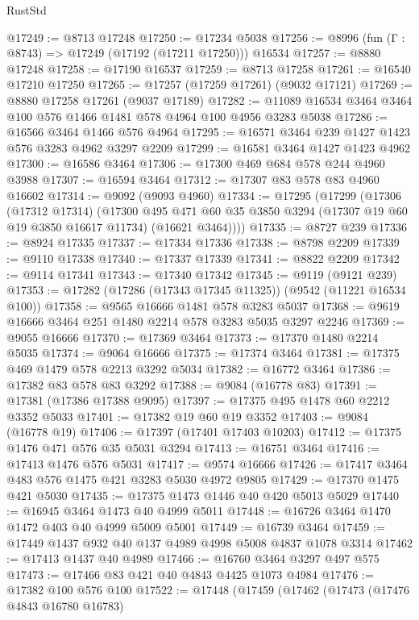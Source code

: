 \begin{lexlean}{RustStd}
\begin{coremodule}
@17249 := @8713 @17248
@17250 := @17234 @5038
@17256 := @8996 (fun (Γ : @8743) => @17249 (@17192 (@17211 @17250))) @16534
@17257 := @8880 @17248
@17258 := @17190 @16537
@17259 := @8713 @17258
@17261 := @16540 @17210 @17250
@17265 := @17257 (@17259 @17261) (@9032 @17121)
@17269 := @8880 @17258 @17261 (@9037 @17189)
@17282 := @11089 @16534 @3464 @3464 @100 @576 @1466 @1481 @578 @4964 @100 @4956 @3283 @5038
@17286 := @16566 @3464 @1466 @576 @4964
@17295 := @16571 @3464 @239 @1427 @1423 @576 @3283 @4962 @3297 @2209
@17299 := @16581 @3464 @1427 @1423 @4962
@17300 := @16586 @3464
@17306 := @17300 @469 @684 @578 @244 @4960 @3988
@17307 := @16594 @3464
@17312 := @17307 @83 @578 @83 @4960 @16602
@17314 := @9092 (@9093 @4960)
@17334 := @17295
    (@17299
      (@17306
        (@17312 @17314)
        (@17300
          @495
          @471
          @60
          @35
          @3850
          @3294
          (@17307 @19 @60 @19 @3850 @16617 @11734)
          (@16621 @3464))))
@17335 := @8727 @239
@17336 := @8924 @17335
@17337 := @17334 @17336
@17338 := @8798 @2209
@17339 := @9110 @17338
@17340 := @17337 @17339
@17341 := @8822 @2209
@17342 := @9114 @17341
@17343 := @17340 @17342
@17345 := @9119 (@9121 @239)
@17353 := @17282 (@17286 (@17343 @17345 @11325)) (@9542 (@11221 @16534 @100))
@17358 := @9565 @16666 @1481 @578 @3283 @5037
@17368 := @9619 @16666 @3464 @251 @1480 @2214 @578 @3283 @5035 @3297 @2246
@17369 := @9055 @16666
@17370 := @17369 @3464
@17373 := @17370 @1480 @2214 @5035
@17374 := @9064 @16666
@17375 := @17374 @3464
@17381 := @17375 @469 @1479 @578 @2213 @3292 @5034
@17382 := @16772 @3464
@17386 := @17382 @83 @578 @83 @3292
@17388 := @9084 (@16778 @83)
@17391 := @17381 (@17386 @17388 @9095)
@17397 := @17375 @495 @1478 @60 @2212 @3352 @5033
@17401 := @17382 @19 @60 @19 @3352
@17403 := @9084 (@16778 @19)
@17406 := @17397 (@17401 @17403 @10203)
@17412 := @17375 @1476 @471 @576 @35 @5031 @3294
@17413 := @16751 @3464
@17416 := @17413 @1476 @576 @5031
@17417 := @9574 @16666
@17426 := @17417 @3464 @483 @576 @1475 @421 @3283 @5030 @4972 @9805
@17429 := @17370 @1475 @421 @5030
@17435 := @17375 @1473 @1446 @40 @420 @5013 @5029
@17440 := @16945 @3464 @1473 @40 @4999 @5011
@17448 := @16726 @3464 @1470 @1472 @403 @40 @4999 @5009 @5001
@17449 := @16739 @3464
@17459 := @17449 @1437 @932 @40 @137 @4989 @4998 @5008 @4837 @1078 @3314
@17462 := @17413 @1437 @40 @4989
@17466 := @16760 @3464 @3297 @497 @575
@17473 := @17466 @83 @421 @40 @4843 @4425 @1073 @4984
@17476 := @17382 @100 @576 @100
@17522 := @17448
    (@17459
      (@17462
        (@17473
          (@17476 @4843 @16780 @16783)

\end{coremodule}
\end{lexlean}
